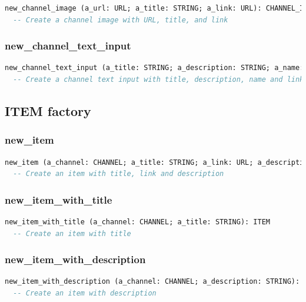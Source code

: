 \begin{lstlisting}[language=Eiffel]
new_channel_image (a_url: URL; a_title: STRING; a_link: URL): CHANNEL_IMAGE
  -- Create a channel image with URL, title, and link
\end{lstlisting}


\subsubsection{new\_channel\_text\_input}

\begin{lstlisting}[language=Eiffel]
new_channel_text_input (a_title: STRING; a_description: STRING; a_name: STRING; a_link: URL): CHANNEL_TEXT_INPUT
  -- Create a channel text input with title, description, name and link
\end{lstlisting}


\subsection{ITEM factory}
\label{sec:syndication-factory-item}

\subsubsection{new\_item}

\begin{lstlisting}[language=Eiffel]
new_item (a_channel: CHANNEL; a_title: STRING; a_link: URL; a_description: STRING): ITEM
  -- Create an item with title, link and description
\end{lstlisting}


\subsubsection{new\_item\_with\_title}

\begin{lstlisting}[language=Eiffel]
new_item_with_title (a_channel: CHANNEL; a_title: STRING): ITEM
  -- Create an item with title
\end{lstlisting}


\subsubsection{new\_item\_with\_description}

\begin{lstlisting}[language=Eiffel]
new_item_with_description (a_channel: CHANNEL; a_description: STRING): ITEM
  -- Create an item with description
\end{lstlisting}


